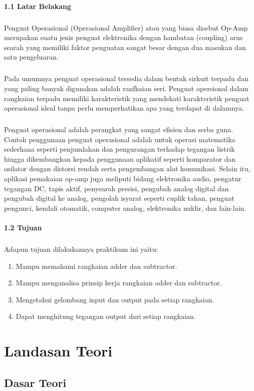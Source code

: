 \documentclass[12pt,a4paper]{article}
\begin{document}
\paragraph{1.1 Latar Belakang}
\subparagraph{ }
	Penguat Operasional (Operasional Amplifier) atau yang biasa disebut Op-Amp merupakan suatu jenis penguat elektronika dengan hambatan (coupling) arus searah yang memiliki faktor penguatan sangat besar dengan dua masukan dan satu pengeluaran.
\subparagraph{ }
	Pada umumnya penguat operasional tersedia dalam bentuk sirkuit terpadu dan yang paling banyak digunakan adalah ranfkaian seri. Penguat opersional dalam rangkaian terpadu memiliki karakteristik yang mendekati karakteristik penguat operasional ideal tanpa perlu memperhatikan apa yang terdapat di dalamnya.
\subparagraph{ }
Penguat operasional adalah perangkat yang sangat efisien dan serba guna. Contoh penggunaan penguat operasional adalah untuk operasi matematika sederhana seperti penjumlahan dan pengurangan terhadap tegangan listrik hingga dikembangkan kepada penggunaan aplikatif seperti komparator dan osilator dengan distorsi rendah serta pengembangan alat komunikasi. Selain itu, aplikasi pemakaian op-amp juga meliputi bidang elektronika audio, pengatur tegangan DC, tapis aktif, penyearah presisi, pengubah analog digital dan pengubah digital ke analog, pengolah isyarat seperti cuplik tahan, penguat pengunci, kendali otomatik, computer analog, elektronika nuklir, dan lain-lain.

\paragraph{1.2 Tujuan}
\subparagraph{ }
Adapun tujuan dilakukannya praktikum ini yaitu:
\begin{enumerate}
\item Mampu memahami rangkaian adder dan subtractor.
\item Mampu menganalisa prinsip kerja rangkaian adder dan subtractor.
\item Mengetahui gelombang input dan output pada setiap rangkaian.
\item Dapat menghitung tegangan output dari setiap rangkaian.
\end{enumerate}


\newpage
\section{Landasan Teori}
\subsection{Dasar Teori}
\end{document}
